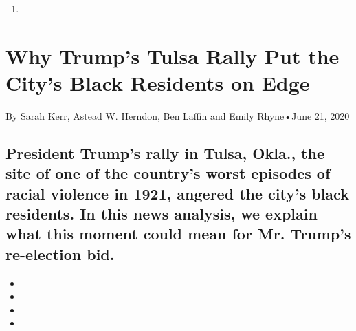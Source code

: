 \begin{enumerate}
\def\labelenumi{\arabic{enumi}.}
\setcounter{enumi}{2019}
\item
\end{enumerate}

\hypertarget{why-trumps-tulsa-rally-put-the-citys-black-residents-on-edge-1}{%
\section{Why Trump's Tulsa Rally Put the City's Black Residents on
Edge}\label{why-trumps-tulsa-rally-put-the-citys-black-residents-on-edge-1}}

By Sarah Kerr, Astead W. Herndon, Ben Laffin and Emily Rhyne•June 21,
2020

\hypertarget{president-trumps-rally-in-tulsa-okla-the-site-of-one-of-the-countrys-worst-episodes-of-racial-violence-in-1921-angered-the-citys-black-residents-in-this-news-analysis-we-explain-what-this-moment-could-mean-for-mr-trumps-re-election-bid-1}{%
\subsection{President Trump's rally in Tulsa, Okla., the site of one of
the country's worst episodes of racial violence in 1921, angered the
city's black residents. In this news analysis, we explain what this
moment could mean for Mr. Trump's re-election
bid.}\label{president-trumps-rally-in-tulsa-okla-the-site-of-one-of-the-countrys-worst-episodes-of-racial-violence-in-1921-angered-the-citys-black-residents-in-this-news-analysis-we-explain-what-this-moment-could-mean-for-mr-trumps-re-election-bid-1}}

\begin{itemize}
\item
\item
\item
\item
\end{itemize}

